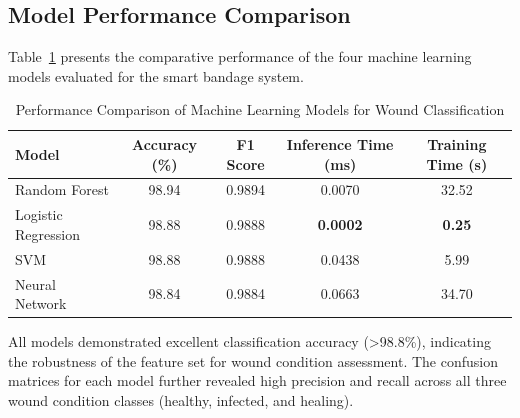 \documentclass[conference]{IEEEtran}
\begin{document}
\subsection{Model Performance Comparison}
Table~\ref{tab:model_comparison} presents the comparative performance of the four machine learning models evaluated for the smart bandage system.

\begin{table}[H]
\caption{Performance Comparison of Machine Learning Models for Wound Classification}
\label{tab:model_comparison}
\centering
\begin{tabular}{lcccc}
\toprule
\textbf{Model} & \textbf{Accuracy (\%)} & \textbf{F1 Score} & \textbf{Inference Time (ms)} & \textbf{Training Time (s)} \\
\midrule
Random Forest & 98.94 & 0.9894 & 0.0070 & 32.52 \\
Logistic Regression & 98.88 & 0.9888 & \textbf{0.0002} & \textbf{0.25} \\
SVM & 98.88 & 0.9888 & 0.0438 & 5.99 \\
Neural Network & 98.84 & 0.9884 & 0.0663 & 34.70 \\
\bottomrule
\end{tabular}
\end{table}

All models demonstrated excellent classification accuracy (>98.8\%), indicating the robustness of the feature set for wound condition assessment. The confusion matrices for each model further revealed high precision and recall across all three wound condition classes (healthy, infected, and healing).
\end{document}
